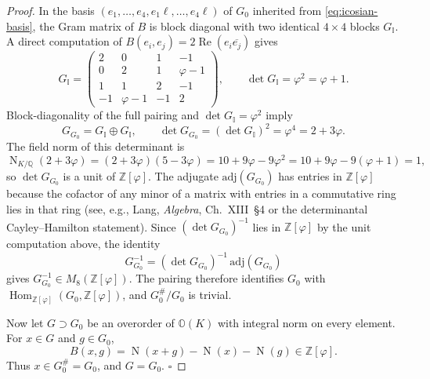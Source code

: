 \documentclass[10pt,a4paper]{amsart}
\newcommand{\Norm}{\operatorname{N}}
\newcommand{\Oct}{\mathbb O}
\newcommand{\QQ}{\mathbb Q}
\newcommand{\Rea}{\operatorname{Re}}
\newcommand{\Zphi}{\mathbb Z[\varphi]}
\begin{document}
\begin{proof}
In the basis \((e_1,\ldots,e_4,e_1\ell,\ldots,e_4\ell)\) of \(G_0\) inherited from \eqref{eq:icosian-basis}, the Gram matrix of \(B\) is block diagonal with two identical \(4\times 4\) blocks \(G_{\mathbb I}\). A direct computation of \(B(e_i,e_j)=2\Rea(e_i\overline{e_j})\) gives
\begin{equation}
G_{\mathbb I}=
\begin{pmatrix}
2 & 0 & 1 & -1 \\
0 & 2 & 1 & \varphi-1 \\
1 & 1 & 2 & -1 \\
-1 & \varphi-1 & -1 & 2
\end{pmatrix},
\qquad
\det G_{\mathbb I}=\varphi^{2}=\varphi+1.
\label{eq:gram-icosian}
\end{equation}
Block-diagonality of the full pairing and \(\det G_{\mathbb I}=\varphi^{2}\) imply
\begin{equation}
G_{G_0}=G_{\mathbb I}\oplus G_{\mathbb I},
\qquad
\det G_{G_0}=(\det G_{\mathbb I})^{2}=\varphi^{4}=2+3\varphi.
\label{eq:gram-g0}
\end{equation}
The field norm of this determinant is
\begin{equation}
\Norm_{K/\QQ}(2+3\varphi)=(2+3\varphi)(5-3\varphi)=10+9\varphi-9\varphi^2=10+9\varphi-9(\varphi+1)=1,
\end{equation}
so \(\det G_{G_0}\) is a unit of \(\Zphi\). The adjugate \(\mathrm{adj}(G_{G_0})\) has entries in \(\Zphi\) because the cofactor of any minor of a matrix with entries in a commutative ring lies in that ring (see, e.g., Lang, \emph{Algebra}, Ch.~XIII~\S4 or the determinantal Cayley--Hamilton statement). Since \((\det G_{G_0})^{-1}\) lies in \(\Zphi\) by the unit computation above, the identity
\begin{equation}
G_{G_0}^{-1}=(\det G_{G_0})^{-1}\,\mathrm{adj}(G_{G_0})
\end{equation}
gives \(G_{G_0}^{-1}\in M_{8}(\Zphi)\). The pairing therefore identifies \(G_0\) with \(\operatorname{Hom}_{\Zphi}(G_0,\Zphi)\), and \(G_0^\#/G_0\) is trivial.

Now let \(G\supset G_0\) be an overorder of \(\Oct(K)\) with integral norm on every element. For \(x\in G\) and \(g\in G_0\),
\begin{equation}
B(x,g)=\Norm(x+g)-\Norm(x)-\Norm(g)\in\Zphi.
\end{equation}
Thus \(x\in G_0^\#=G_0\), and \(G=G_0\). \(\square\)
\end{proof}
\end{document}
